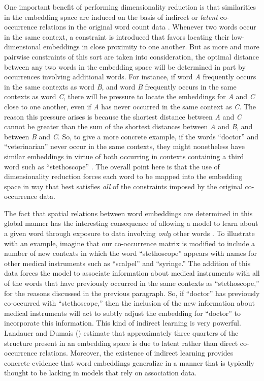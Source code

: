 One important benefit of performing dimensionality reduction is that similarities in the embedding space are induced on the basis of indirect or \textit{latent} co-occurrence relations in the original word count data \citep{TurneyPantel:2010,LandauerDumais:1997,JonesMewhort:2007}. Whenever two words occur in the same context, a constraint is introduced that favors locating their low-dimensional embeddings in close proximity to one another. But as more and more pairwise constraints of this sort are taken into consideration, the optimal distance between any two words in the embedding space will be determined in part by occurrences involving additional words. For instance, if word \textit{A} frequently occurs in the same contexts as word \textit{B}, and word \textit{B} frequently occurs in the same contexts as word \textit{C}, there will be pressure to locate the embeddings for \textit{A} and \textit{C} close to one another, even if \textit{A} has never occurred in the same context as \textit{C}. The reason this pressure arises is because the shortest distance between \textit{A} and \textit{C} cannot be greater than the sum of the shortest distances between \textit{A} and \textit{B}, and between \textit{B} and \textit{C}. So, to give a more concrete example, if the words ``doctor'' and ``veterinarian'' never occur in the same contexts, they might nonetheless have similar embeddings in virtue of both occurring in contexts containing a third word such as ``stethoscope'' \citep{LandauerDumais:1997,JonesMewhort:2007}. The overall point here is that the use of dimensionality reduction forces each word to be mapped into the embedding space in way that best satisfies \textit{all} of the constraints imposed by the original co-occurrence data.

The fact that spatial relations between word embeddings are determined in this global manner has the interesting consequence of allowing a model to learn about a given word through exposure to data involving \textit{only} other words \citep{LandauerDumais:1997}. To illustrate with an example, imagine that our co-occurrence matrix is modified to include a number of new contexts in which the word ``stethoscope'' appears with names for other medical instruments such as ``scalpel'' and ``syringe.'' The addition of this data forces the model to associate information about medical instruments with all of the words that have previously occurred in the same contexts as ``stethoscope,'' for the reasons discussed in the previous paragraph. So, if ``doctor'' has previously co-occurred with ``stethoscope,'' then the inclusion of the new information about medical instruments will act to subtly adjust the embedding for ``doctor'' to incorporate this information. This kind of indirect learning is very powerful. Landauer and Dumais (\citeyear[][pp. 223-6]{LandauerDumais:1997}) estimate that approximately three quarters of the structure present in an embedding space is due to latent rather than direct co-occurrence relations. Moreover, the existence of indirect learning provides concrete evidence that word embeddings generalize in a manner that is typically thought to be lacking in models that rely on association data.

